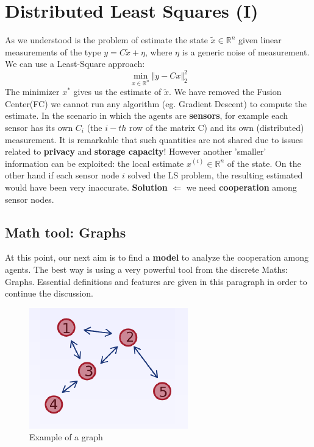 \section{Distributed Least Squares (I)}
As we understood is the problem of estimate the state $\tilde{x}\in \mathbb{R}^n$ given linear measurements of the type $y=C\tilde{x}+\eta$, where $\eta$ is a generic noise of measurement. We can use a Least-Square approach:
\begin{equation}
    \min_{x \in \mathbb{R}^n} \Vert y-Cx \Vert_2^2
\end{equation}
The minimizer $x^*$ gives us the estimate of $\tilde{x}$. We have removed the Fusion Center(FC) we cannot run any algorithm (eg. Gradient Descent) to compute the estimate. In the scenario in which the agents are \textbf{sensors}, for example each sensor has its own $C_i$ (the $i-th$ row of the matrix C) and its own (distributed) measurement. It is remarkable that such quantities are not shared due to issues related to \textbf{privacy} and \textbf{storage capacity}! However another 'smaller' information can be exploited: the local estimate $x^{(i)} \in \mathbb{R}^n$ of the state. On the other hand if each sensor node $i$ solved the LS problem, the resulting estimated would have been very inaccurate. \textbf{Solution} $\Leftarrow$ we need \textbf{cooperation} among sensor nodes.

\subsection*{Math tool: Graphs}
At this point, our next aim is to find a \textbf{model} to analyze the cooperation among agents. The best way is using a very powerful tool from the discrete Maths: Graphs. Essential definitions and features are given in this paragraph in order to continue the discussion. 
\begin{figure}[h]
    \centering
    \includegraphics[scale=1.2]{images/Graph.png}
    \caption{Example of a graph}    
\end{figure}

